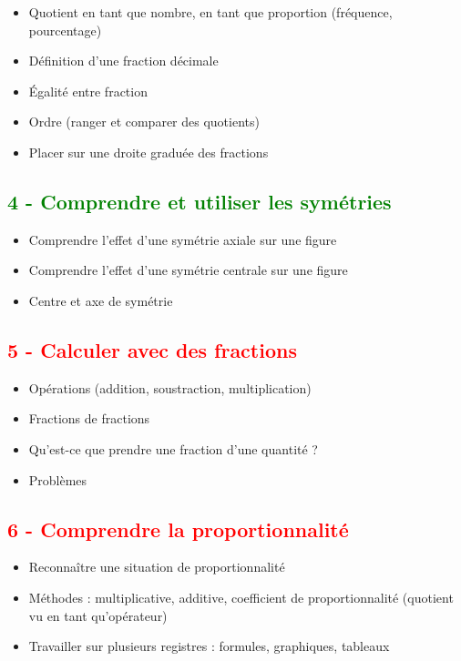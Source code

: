 \documentclass[12pt]{article}
\begin{document}
\begin{multicols}{2}
\begin{itemize}
\item Quotient en tant que nombre, en tant que proportion (fréquence, pourcentage)
\item Définition d'une fraction décimale
\item Égalité entre fraction
\item Ordre (ranger et comparer des quotients)
\item Placer sur une droite graduée des fractions
\end{itemize}

\subsection*{\textcolor{green}{4 - Comprendre et utiliser les symétries}}

\begin{itemize}
\item Comprendre l’effet d'une symétrie axiale sur une figure
\item Comprendre l'effet d'une symétrie centrale sur une figure
\item Centre et axe de symétrie
\end{itemize}

\subsection*{\textcolor{red}{5 - Calculer avec des fractions}}

\begin{itemize}

\item Opérations (addition, soustraction, multiplication)
\item Fractions de fractions
\item Qu'est-ce que prendre une fraction d'une quantité ?
\item Problèmes
\end{itemize}

\subsection*{\textcolor{red}{6 - Comprendre la proportionnalité}}

\begin{itemize}
\item Reconnaître une situation de proportionnalité
\item Méthodes : multiplicative, additive, coefficient de proportionnalité (quotient vu en tant qu’opérateur)
\item Travailler sur plusieurs registres : formules, graphiques, tableaux
\end{itemize}


\end{multicols}
\end{document}
